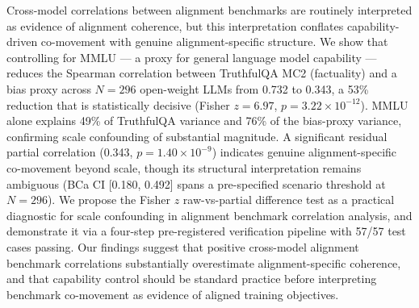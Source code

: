 Cross-model correlations between alignment benchmarks are routinely interpreted as evidence of alignment coherence, but this interpretation conflates capability-driven co-movement with genuine alignment-specific structure. We show that controlling for MMLU --- a proxy for general language model capability --- reduces the Spearman correlation between TruthfulQA MC2 (factuality) and a bias proxy across $N{=}296$ open-weight LLMs from 0.732 to 0.343, a 53\% reduction that is statistically decisive (Fisher $z = 6.97$, $p = 3.22 \times 10^{-12}$). MMLU alone explains 49\% of TruthfulQA variance and 76\% of the bias-proxy variance, confirming scale confounding of substantial magnitude. A significant residual partial correlation (0.343, $p = 1.40 \times 10^{-9}$) indicates genuine alignment-specific co-movement beyond scale, though its structural interpretation remains ambiguous (BCa CI [0.180, 0.492] spans a pre-specified scenario threshold at $N{=}296$). We propose the Fisher $z$ raw-vs-partial difference test as a practical diagnostic for scale confounding in alignment benchmark correlation analysis, and demonstrate it via a four-step pre-registered verification pipeline with 57/57 test cases passing. Our findings suggest that positive cross-model alignment benchmark correlations substantially overestimate alignment-specific coherence, and that capability control should be standard practice before interpreting benchmark co-movement as evidence of aligned training objectives.
